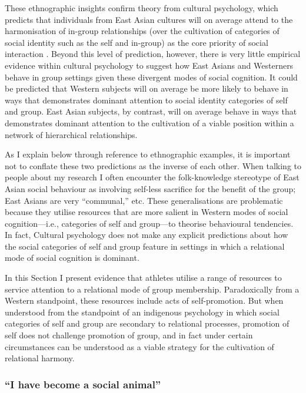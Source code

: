 \begin{CJK}{UTF8}{gbsn}
These ethnographic insights confirm theory from cultural psychology, which predicts that individuals from East Asian cultures will on average attend to the harmonisation of in-group relationships (over the cultivation of categories of social identity such as the self and in-group) as the core priority of social interaction \citep{Yuki2003,Nisbett2003}.  Beyond this level of prediction, however, there is very little empirical evidence within cultural psychology to suggest how East Asians and Westerners behave in group settings given these divergent modes of social cognition.  It could be predicted that Western subjects will on average be more likely to behave in ways that demonstrates dominant attention to social identity categories of self and group.  East Asian subjects, by contrast, will on average behave in ways that demonstrates dominant attention to the cultivation of a viable position within a network of hierarchical relationships.

As I explain below through reference to ethnographic examples, it is important not to conflate these two predictions as the inverse of each other.  When talking to people about my research I often encounter the folk-knowledge stereotype of East Asian social behaviour as involving self-less sacrifice for the benefit of the group; East Asians are very ``communal,'' etc.  These generalisations are problematic because they utilise resources that are more salient in Western modes of social cognition---i.e., categories of self and group---to theorise behavioural tendencies.  In fact, Cultural psychology does not make any explicit predictions about how the social categories of self and group feature in settings in which a relational mode of social cognition is dominant.

In this Section I present evidence that athletes utilise a range of resources to service attention to a relational mode of group membership.  Paradoxically from a Western standpoint, these resources include acts of self-promotion.  But when understood from the standpoint of an indigenous psychology in which social categories of self and group are secondary to relational processes, promotion of self does not challenge promotion of group, and in fact under certain circumstances can be understood as a viable strategy for the cultivation of relational harmony.



  \subsubsection{``I have become a social animal''\label{sect:socialAnimal}}


\end{CJK}
